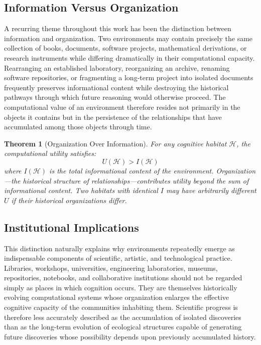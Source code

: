 \documentclass[12pt,oneside]{article}
\newtheorem{theorem}[definition]{Theorem}
\theoremstyle{remark}
\begin{document}
\subsection{Information Versus Organization}

A recurring theme throughout this work has been the distinction between information and organization. Two environments may contain precisely the same collection of books, documents, software projects, mathematical derivations, or research instruments while differing dramatically in their computational capacity. Rearranging an established laboratory, reorganizing an archive, renaming software repositories, or fragmenting a long-term project into isolated documents frequently preserves informational content while destroying the historical pathways through which future reasoning would otherwise proceed. The computational value of an environment therefore resides not primarily in the objects it contains but in the persistence of the relationships that have accumulated among those objects through time.

\begin{theorem}[Organization Over Information]
For any cognitive habitat \(\mathcal{H}\), the computational utility satisfies:
\[
U(\mathcal{H}) > I(\mathcal{H})
\]
where \(I(\mathcal{H})\) is the total informational content of the environment. Organization—the historical structure of relationships—contributes utility beyond the sum of informational content. Two habitats with identical \(I\) may have arbitrarily different \(U\) if their historical organizations differ.
\end{theorem}

\subsection{Institutional Implications}

This distinction naturally explains why environments repeatedly emerge as indispensable components of scientific, artistic, and technological practice. Libraries, workshops, universities, engineering laboratories, museums, repositories, notebooks, and collaborative institutions should not be regarded simply as places in which cognition occurs. They are themselves historically evolving computational systems whose organization enlarges the effective cognitive capacity of the communities inhabiting them. Scientific progress is therefore less accurately described as the accumulation of isolated discoveries than as the long-term evolution of ecological structures capable of generating future discoveries whose possibility depends upon previously accumulated history.
\end{document}
